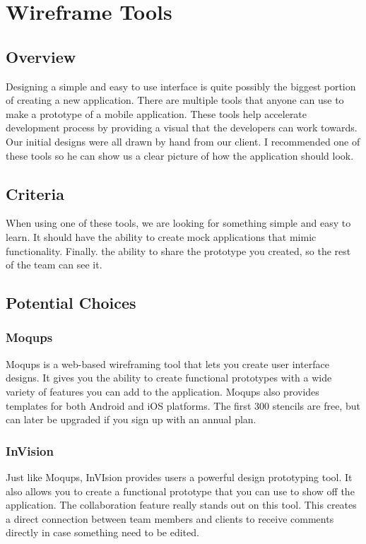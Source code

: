 \documentclass[onecolumn, draftclsnofoot,10pt, compsoc]{IEEEtran}
\begin{document}
\clearpage
\section{Wireframe Tools}
\subsection{Overview}

Designing a simple and easy to use interface is quite possibly the biggest portion of creating a new application. There are multiple tools that anyone can use to make a prototype of a mobile application. These tools help accelerate development process by providing a visual that the developers can work towards. Our initial designs were all drawn by hand from our client. I recommended one of these tools so he can show us a clear picture of how the application should look.

\subsection{Criteria}

When using one of these tools, we are looking for something simple and easy to learn. It should have the ability to create mock applications that mimic functionality. Finally. the ability to share the prototype you created, so the rest of the team can see it.

\subsection{Potential Choices}
\subsubsection{Moqups}

Moqups is a web-based wireframing tool that lets you create user interface designs. It gives you the ability to create functional prototypes with a wide variety of features you can add to the application. Moqups also provides templates for both Android and iOS platforms. The first 300 stencils are free, but can later be upgraded if you sign up with an annual plan.

\subsubsection{InVision}

Just like Moqups, InVIsion provides users a powerful design prototyping tool. It also allows you to create a functional prototype that you can use to show off the application. The collaboration feature really stands out on this tool. This creates a direct connection between team members and clients to receive comments directly in case something need to be edited. 
\end{document}
